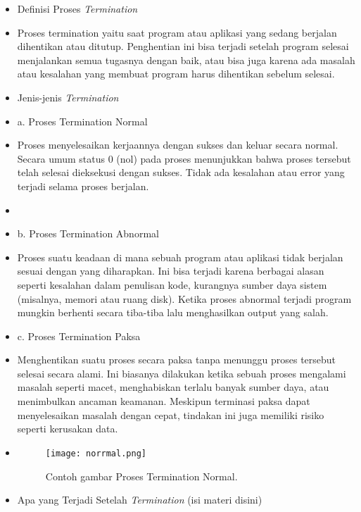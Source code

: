 \documentclass[12pt]{article}
\begin{document}
\begin{itemize}
    \item Definisi Proses \textit{Termination}
    \item[] 
Proses termination yaitu saat program atau aplikasi yang sedang berjalan dihentikan atau ditutup. Penghentian ini bisa terjadi setelah program selesai menjalankan semua tugasnya dengan baik, atau bisa juga karena ada masalah atau kesalahan yang membuat program harus dihentikan sebelum selesai.

    \item Jenis-jenis \textit{Termination}
    \item[] 
a. Proses Termination Normal
     \item[]
Proses menyelesaikan kerjaannya dengan sukses dan keluar secara normal. Secara umum status 0 (nol) pada proses menunjukkan bahwa proses tersebut telah selesai dieksekusi dengan sukses. Tidak ada kesalahan atau error yang terjadi selama proses berjalan.
     \item[]
     \item[] 
b. Proses Termination Abnormal
     \item[]
Proses suatu keadaan di mana sebuah program atau aplikasi tidak berjalan sesuai dengan yang diharapkan. Ini bisa terjadi karena berbagai alasan seperti kesalahan dalam penulisan kode, kurangnya sumber daya sistem (misalnya, memori atau ruang disk). Ketika proses abnormal terjadi program mungkin berhenti secara tiba-tiba lalu menghasilkan output yang salah.
     \item[]
c. Proses Termination Paksa
     \item[]
Menghentikan suatu proses secara paksa tanpa menunggu proses tersebut selesai secara alami. Ini biasanya dilakukan ketika sebuah proses mengalami masalah seperti macet, menghabiskan terlalu banyak sumber daya, atau menimbulkan ancaman keamanan. Meskipun terminasi paksa dapat menyelesaikan masalah dengan cepat, tindakan ini juga memiliki risiko seperti kerusakan data.
    \item[]

\begin{figure}[h]
\centering
\texttt{[image: norrmal.png]}
\caption{Contoh gambar Proses Termination Normal.}
\end{figure}

    \item Apa yang Terjadi Setelah \textit{Termination}
    (isi materi disini)
\end{itemize}
\end{document}
